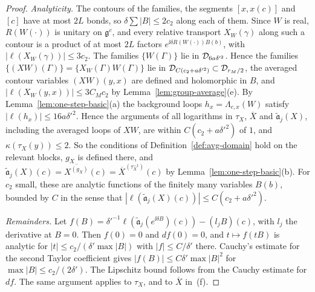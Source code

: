 \begin{proof}
\emph{Analyticity.} The contours of the families, the segments $[x,x(c)]$ and $[c]$ have at most $2L$ bonds, so $\delta\sum|B|\le2c_2$ along each of them. Since $W$ is real, $R(W(\cdot))$ is unitary on $\mathfrak g^c$, and every relative transport $X_W(\gamma)$ along such a contour is a product of at most $2L$ factors $e^{\ii\delta R(W(\cdot))B(b)}$, with $|\ell(X_W(\gamma))|\le3c_2$. The families $\{W(\Gamma)\}$ lie in $\mathcal D_{6a\delta'^2}$. Hence the families $\{(XW)(\Gamma)\}=\{X_W(\Gamma)W(\Gamma)\}$ lie in $\mathcal D_{C(c_2+a\delta'^2)}\subset\mathcal D_{r_M/2}$, the averaged contour variables $(XW)(y,x)$ are defined and holomorphic in $B$, and $|\ell(X_W(y,x))|\le3C_Mc_2$ by Lemma~\ref{lem:group-average}(e). By Lemma~\ref{lem:one-step-basic}(a) the background loops $h_x=\Lambda_{c,x}(W)$ satisfy $|\ell(h_x)|\le16a\delta'^2$. Hence the arguments of all logarithms in $\tau_X$, $\overline X$ and $\tilde{\mathfrak a}_j(X)$, including the averaged loops of $XW$, are within $C(c_2+a\delta'^2)$ of $1$, and $\kappa(\tau_X(y))\le2$. So the conditions of Definition~\ref{def:avg-domain} hold on the relevant blocks, $g_X$ is defined there, and $\tilde{\mathfrak a}_j(X)(c)=\overline{X^{(g_X)}}(c)=\overline X^{(\tau_X^{-1})}(c)$ by Lemma~\ref{lem:one-step-basic}(b). For $c_2$ small, these are analytic functions of the finitely many variables $B(b)$, bounded by $C$ in the sense that $|\ell(\tilde{\mathfrak a}_j(X)(c))|\le C(c_2+a\delta'^2)$.

\emph{Remainders.} Let $f(B)=\delta'^{-1}\ell(\tilde{\mathfrak a}_j(e^{\ii\delta B})(c))-(l_jB)(c)$, with $l_j$ the derivative at $B=0$. Then $f(0)=0$ and $df(0)=0$, and $t\mapsto f(tB)$ is analytic for $|t|\le c_2/(\delta'\max|B|)$ with $|f|\le C/\delta'$ there. Cauchy's estimate for the second Taylor coefficient gives $|f(B)|\le C\delta'\max|B|^2$ for $\max|B|\le c_2/(2\delta')$. The Lipschitz bound follows from the Cauchy estimate for $df$. The same argument applies to $\tau_X$, and to $\overline X$ in~(f).


\end{proof}
